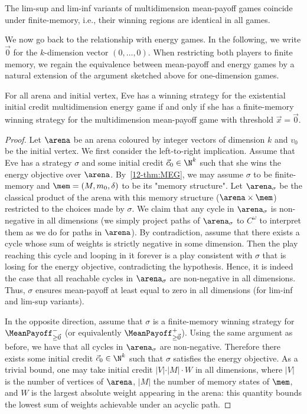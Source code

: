 \begin{proposition}
\label{12-prop:MPSI}
The lim-sup and lim-inf variants of multidimension mean-payoff games coincide under finite-memory, i.e., their winning regions are identical in all games.
\end{proposition}

We now go back to the relationship with energy games. In the following, we write  $\vec{0}$ for the $k$-dimension vector $(0,\ldots{},0)$. When restricting both players to finite memory, we regain the equivalence between mean-payoff and energy games by a natural extension of the argument sketched above for one-dimension games.

\begin{theorem}
\label{12-thm:MPEG-equivalence}
For all arena and initial vertex, Eve has a winning strategy for the existential initial credit multidimension energy game if and only if she has a finite-memory winning strategy for the multidimension mean-payoff game with threshold $\vec{x} = \vec{0}$.
\end{theorem}

\begin{proof}
Let $\arena$ be an arena coloured by integer vectors of dimension $k$ and $v_0$ be the initial vertex. We first consider the left-to-right implication. Assume that Eve has a strategy $\sigma$ and some initial credit $\vec{c}_0 \in \N^k$ such that she wins the energy objective over $\arena$. By~\cref{12-thm:MEG}, we may assume $\sigma$ to be finite-memory and $\mem = (M, m_0, \delta)$ to be its "memory structure". Let $\arena_\sigma$ be the classical product of the arena with this memory structure ($\arena \times \mem$) restricted to the choices made by $\sigma$. We claim that any cycle in $\arena_\sigma$ is non-negative in all dimensions (we simply project paths of $\arena_\sigma$ to $C^\omega$ to interpret them as we do for paths in $\arena$). By contradiction, assume that there exists a cycle whose sum of weights is strictly negative in some dimension. Then the play reaching this cycle and looping in it forever is a play consistent with $\sigma$ that is losing for the energy objective, contradicting the hypothesis. Hence, it is indeed the case that all reachable cycles in $\arena_\sigma$ are non-negative in all dimensions. Thus, $\sigma$ ensures mean-payoff at least equal to zero in all dimensions (for lim-inf and lim-sup variants).

In the opposite direction, assume that $\sigma$ is a finite-memory winning strategy for $\MeanPayoff^{-}_{\geq \vec{0}}$ (or equivalently $\MeanPayoff^{+}_{\geq \vec{0}}$). Using the same argument as before, we have that all cycles in $\arena_\sigma$ are non-negative. Therefore there exists some initial credit $\vec{c}_0 \in \N^k$ such that $\sigma$ satisfies the energy objective. As a trivial bound, one may take initial credit $\vert V\vert \cdot \vert M \vert \cdot W$ in all dimensions, where $\vert V\vert$ is the number of vertices of $\arena$, $\vert M \vert$ the number of memory states of $\mem$, and $W$ is the largest absolute weight appearing in the arena: this quantity bounds the lowest sum of weights achievable under an acyclic path.
\end{proof}

